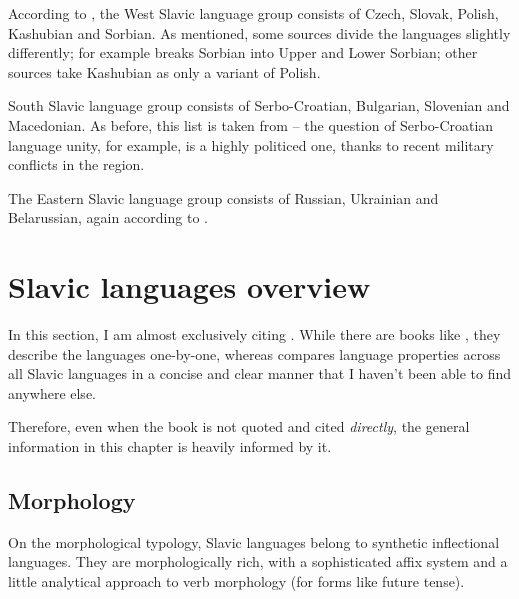 According to \cite{sussex2011slavic}, the West Slavic language group consists of Czech, Slovak, Polish, Kashubian and Sorbian. As mentioned, some sources divide the languages slightly differently; for example \cite{siewierska1998overview} breaks Sorbian into Upper and Lower Sorbian; other sources take Kashubian as only a variant of Polish.

South Slavic language group consists of Serbo-Croatian, Bulgarian, Slovenian and Macedonian. As before, this list is taken from \cite{sussex2011slavic} -- the question of Serbo-Croatian language unity, for example, is a highly politiced one, thanks to recent military conflicts in the region.

The Eastern Slavic language group consists of Russian, Ukrainian and Belarussian, again according to \cite{sussex2011slavic}.




\section{Slavic languages overview}
\label{slavic_overview}
In this section, I am almost exclusively citing \cite{sussex2011slavic}. While there are books like \cite{comrie2003slavonic}, they describe the languages one-by-one, whereas \cite{sussex2011slavic} compares language properties across all Slavic languages in a concise and clear manner that I haven't been able to find anywhere else.

Therefore, even when the book is not quoted and cited \emph{directly}, the general information in this chapter is heavily informed by it.

\subsection{Morphology}
On the morphological typology, Slavic languages belong to synthetic inflectional languages. They are morphologically rich, with a sophisticated affix system and a little analytical approach to verb morphology (for forms like future tense).

